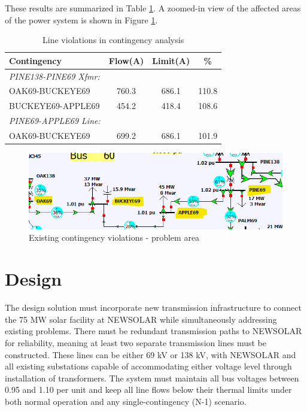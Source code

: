 \documentclass[conference]{IEEEtran}
\begin{document}
These results are summarized in Table \ref{tab:violations}. A zoomed-in view of the affected areas of the power system is shown in Figure \ref{fig:baseviolations}.
\begin{table}[htbp]
	\caption{Line violations in contingency analysis}
	\begin{center}
		\begin{tabular}{|l|c|c|c|}
			\hline
			\textbf{Contingency} & \textbf{Flow(A)} & \textbf{Limit(A)} & \textbf{\%} \\
			\hline
			\textit{PINE138-PINE69 Xfmr:} & & & \\
			OAK69-BUCKEYE69 & 760.3 & 686.1 & 110.8 \\
			BUCKEYE69-APPLE69 & 454.2 & 418.4 & 108.6 \\
			\hline
			\textit{PINE69-APPLE69 Line:} & & & \\
			OAK69-BUCKEYE69 & 699.2 & 686.1 & 101.9 \\
			\hline
		\end{tabular}
		\label{tab:violations}
	\end{center}
\end{table}
\begin{figure}[tbph]
	\centering
	\includegraphics[width=1\linewidth]{figures/base_violations}
	\caption{Existing contingency violations - problem area}
	\label{fig:baseviolations}
\end{figure}
\section{Design}
The design solution must incorporate new transmission infrastructure to connect the 75 MW solar facility at NEWSOLAR while simultaneously addressing existing problems. There must be redundant transmission paths to NEWSOLAR for reliability, meaning at least two separate transmission lines must be constructed. These lines can be either 69 kV or 138 kV, with NEWSOLAR and all existing substations capable of accommodating either voltage level through installation of transformers. The system must maintain all bus voltages between 0.95 and 1.10 per unit and keep all line flows below their thermal limits under both normal operation and any single-contingency (N-1) scenario.
\end{document}
